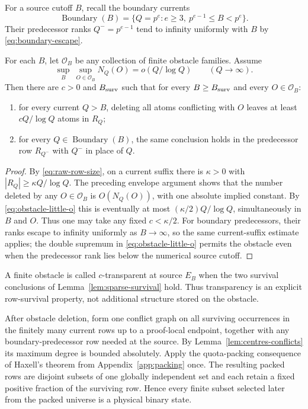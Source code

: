 For a source cutoff $B$, recall the boundary currents
\[
\operatorname{Boundary}(B)
=
\{Q=p^e:e\ge3,\ p^{e-1}\le B<p^e\}.
\]
Their predecessor ranks $Q^-=p^{e-1}$ tend to infinity uniformly with $B$ by
\eqref{eq:boundary-escape}.

\begin{lemma}
\label{lem:sparse-survival}
For each $B$, let $\mathcal O_B$ be any collection of finite obstacle families.
Assume
\[
\sup_B\ \sup_{O\in\mathcal O_B} N_Q(O)
=o(Q/\log Q)
\qquad(Q\to\infty).
\tag{T5}\label{eq:obstacle-little-o}
\]
Then there are $c>0$ and $B_{\rm surv}$ such that for every
$B\ge B_{\rm surv}$ and every $O\in\mathcal O_B$:
\begin{enumerate}
\item for every current $Q>B$, deleting all atoms conflicting with $O$ leaves
at least $cQ/\log Q$ atoms in $R_Q$;
\item for every $Q\in\operatorname{Boundary}(B)$, the same conclusion holds
in the predecessor row $R_{Q^-}$ with $Q^-$ in place of $Q$.
\end{enumerate}
\end{lemma}

\begin{proof}
By \eqref{eq:raw-row-size}, on a current suffix there is $\kappa>0$ with
$|R_Q|\ge\kappa Q/\log Q$.  The preceding envelope argument shows that the
number deleted by any $O\in\mathcal O_B$ is $O(N_Q(O))$, with one absolute
implied constant.  By \eqref{eq:obstacle-little-o} this is eventually at most
$(\kappa/2)Q/\log Q$, simultaneously in $B$ and $O$.  Thus one may take any
fixed $c<\kappa/2$.
For boundary predecessors, their ranks escape to infinity uniformly as
$B\to\infty$, so the same current-suffix estimate applies; the double supremum
in \eqref{eq:obstacle-little-o} permits the obstacle even when the predecessor
rank lies below the numerical source cutoff.
\end{proof}

A finite obstacle is called $c$-transparent at source $E_B$ when the two
survival conclusions of Lemma~\ref{lem:sparse-survival} hold.  Thus
transparency is an explicit row-survival property, not additional structure
stored on the obstacle.

After obstacle deletion, form one conflict graph on all surviving occurrences
in the finitely many current rows up to a proof-local endpoint, together with
any boundary-predecessor row needed at the source.  By
Lemma~\ref{lem:centres-conflicts} its maximum degree is bounded absolutely.
Apply the quota-packing consequence of Haxell's theorem from
Appendix~\ref{app:packing} once.  The resulting packed rows are disjoint
subsets of one globally independent set and each retain a fixed positive
fraction of the surviving row.  Hence every finite subset selected later from
the packed universe is a physical binary state.

